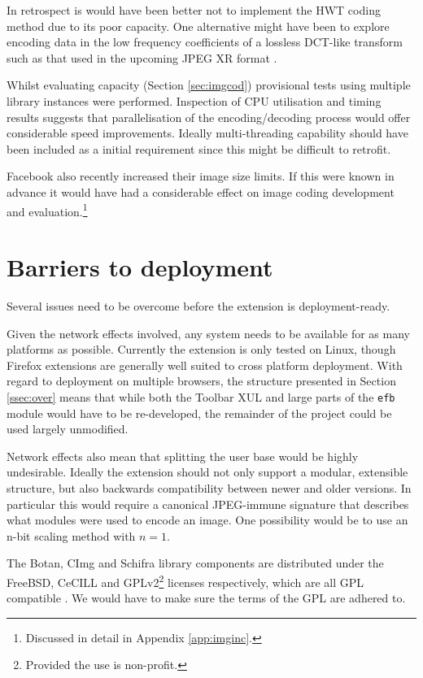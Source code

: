 In retrospect is would have been better not to implement the HWT coding method due to its poor capacity. One alternative might have been to explore encoding data in the low frequency coefficients of a lossless DCT-like transform such as that used in the upcoming JPEG XR format \cite{jpegxr}.

Whilst evaluating capacity (Section \ref{sec:imgcod}) provisional tests using multiple library instances were performed. Inspection of CPU utilisation and timing results suggests that parallelisation of the encoding/decoding process would offer considerable speed improvements. Ideally multi-threading capability should have been included as a initial requirement since this might be difficult to retrofit.

Facebook also recently increased their image size limits. If this were known in advance it would have had a considerable effect on image coding development and evaluation.\footnote{Discussed in detail in Appendix \ref{app:imginc}.}

\section{Barriers to deployment}
\label{sec:deploy}

Several issues need to be overcome before the extension is deployment-ready.

Given the network effects involved, any system needs to be available for as many platforms as possible. Currently the extension is only tested on Linux, though Firefox extensions are generally well suited to cross platform deployment. With regard to deployment on multiple browsers, the structure presented in Section \ref{ssec:over} means that while both the Toolbar XUL and large parts of the {\tt efb} module would have to be re-developed, the remainder of the project could be used largely unmodified.

Network effects also mean that splitting the user base would be highly undesirable. Ideally the extension should not only support a modular, extensible structure, but also backwards compatibility between newer and older versions. In particular this would require a canonical JPEG-immune signature that describes what modules were used to encode an image. One possibility would be to use an n-bit scaling method with $n=1$.

The Botan, CImg and Schifra library components are distributed under the FreeBSD, CeCILL and GPLv2\footnote{Provided the use is non-profit.} licenses respectively, which are all GPL compatible \cite{gpl}. We would have to make sure the terms of the GPL are adhered to.


